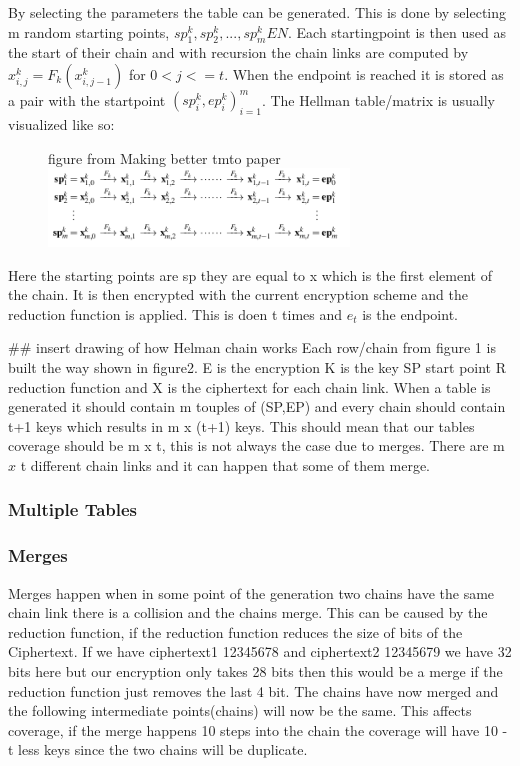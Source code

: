 By selecting the parameters the table can be generated. This is done by selecting m random starting points, $ sp^{k}_1,sp^{k}_2,...,sp^{k}_m E N$. Each startingpoint is then used as the start of their chain and with recursion the chain links are computed by $ x^{k}_{i,j}=F_k( x^{k}_{i,j-1})$ for $0<j<=t$. When the endpoint is reached it is stored as a pair with the startpoint ${( sp^{k}_{i}, ep^{k}_{i})}^{m}_{i=1}$.
The Hellman table/matrix is usually visualized like so:
\\
\begin{figure}[t]
  figure from Making better tmto paper
  \includegraphics[width=8cm]{figures/HellmanMatrix.png}
  \centering
\end{figure}

  Here the starting points are sp they are equal to x which is the first element of the chain. It is then encrypted with the current encryption scheme and the reduction function is applied. This is doen t times and $e_t$ is the endpoint.

  ## insert drawing of how Helman chain works
  Each row/chain from figure 1 is built the way shown in figure2. E is the encryption K is the key SP start point R reduction function and X is the ciphertext for each chain link. When a table is generated it should contain m touples of (SP,EP) and every chain should contain t+1 keys which results in m x (t+1) keys. This should mean that our tables coverage should be m x t, this is not always the case due to merges.
  There are m $x$ t different chain links and it can happen that some of them merge.
\subsubsection {Multiple Tables}

  \subsubsection{Merges}
  Merges happen when in some point of the generation two chains have the same chain link there is a collision and the chains merge. This can be caused by the reduction function, if the reduction function reduces the size of bits of the Ciphertext. If we have ciphertext1 12345678 and ciphertext2 12345679 we have 32 bits here but our encryption only takes 28 bits then this would be a merge if the reduction function just removes the last 4 bit. The chains have now merged and the following intermediate points(chains) will now be the same. This affects coverage, if the merge happens 10 steps into the chain the coverage  will have 10 - t less keys since the two chains will be duplicate.

